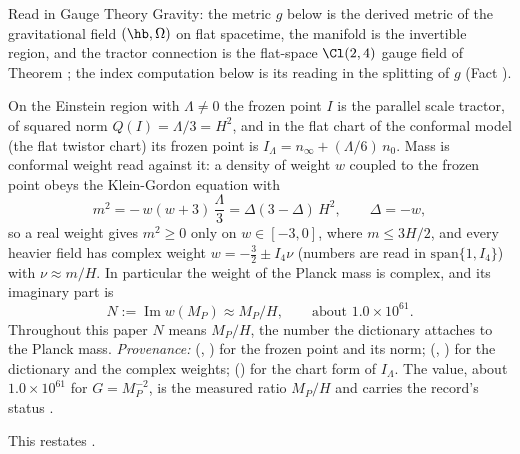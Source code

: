 Read in Gauge Theory Gravity: the metric $g$ below is the derived metric of the gravitational field $(\hb, \Omega)$ on flat spacetime, the manifold is the invertible region, and the tractor connection is the flat-space $\Cl(2,4)$ gauge field of Theorem ; the index computation below is its reading in the splitting of $g$ (Fact ).

On the Einstein region with $\Lambda \neq 0$ the frozen point $I$ is the parallel scale tractor, of squared norm $Q(I) = \Lambda/3 = H^{2}$, and in the flat chart of the conformal model (the flat twistor chart) its frozen point is $I_{\Lambda} = n_{\infty} + (\Lambda/6)\,n_{0}$. Mass is conformal weight read against it: a density of weight $w$ coupled to the frozen point obeys the Klein-Gordon equation with
\[
m^{2} = -\,w(w+3)\,\frac{\Lambda}{3} = \Delta(3-\Delta)\,H^{2}, \qquad \Delta = -w,
\]
so a real weight gives $m^{2} \ge 0$ only on $w \in [-3, 0]$, where $m \le 3H/2$, and every heavier field has complex weight $w = -\tfrac32 \pm I_4\nu$ (numbers are read in $\mathrm{span}\{1, I_4\}$) with $\nu \approx m/H$. In particular the weight of the Planck mass is complex, and its imaginary part is
\[
N := \operatorname{Im} w(M_{P}) \approx M_{P}/H, \qquad\text{about } 1.0 \times 10^{61}.
\]
Throughout this paper $N$ means $M_{P}/H$, the number the dictionary attaches to the Planck mass. \emph{Provenance:} \cite[Thms.~4.5, 4.7]{ButlerT6} (, ) for the frozen point and its norm; \cite[Thm.~3.1, Cor.~3.2]{ButlerT11} (, ) for the dictionary and the complex weights; \cite[Lem.~5.1]{ButlerT11} () for the chart form of $I_{\Lambda}$. The value, about $1.0 \times 10^{61}$ for $G = M_{P}^{-2}$, is the measured ratio $M_{P}/H$ and carries the record's status \cite{PDG2024}.

This restates .
